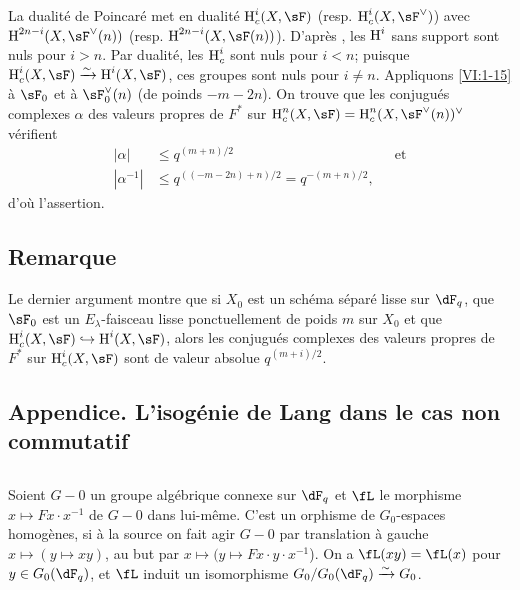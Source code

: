 La dualit\'e de Poincar\'e met en dualit\'e $\h_c^i(X,\sF)$ (resp. 
$\h_c^i(X,\sF^\vee)$) avec $\h^{2n-i}(X,\sF^\vee(n))$ (resp. 
$\h^{2n-i}(X,\sF(n))$). D'apr\`es \cite[XIV 3.2]{sga4}, les $\operatorname{H}^i$ sans support 
sont nuls pour $i>n$. Par dualit\'e, les $\operatorname{H}_c^i$ sont nuls pour $i<n$; puisque 
$\h_c^i(X,\sF) \iso \h^i(X,\sF)$, ces groupes sont nuls pour $i\ne n$. 
Appliquons \ref{VI:1-15} \`a $\sF_0$ et \`a $\sF_0^\vee(n)$ (de poinds 
$-m-2n$). On trouve que les conjugu\'es complexes $\alpha$ des valeurs propres 
de $F^\ast$ sur $\h_c^n(X,\sF) = \h_c^n(X,\sF^\vee(n))^\vee$ v\'erifient 
\begin{align*}
  |\alpha| &\leqslant q^{(m+n)/2} && \text{et} \\
  |\alpha^{-1}| &\leqslant q^{((-m-2n)+n)/2} = q^{-(m+n)/2} \text{,}
\end{align*}
d'o\`u l'assertion. 





\subsection{Remarque}\label{VI:1-21}

Le dernier argument montre que si $X_0$ est un sch\'ema s\'epar\'e lisse sur 
$\dF_q$, que $\sF_0$ est un $E_\lambda$-faisceau lisse ponctuellement de poids 
$m$ sur $X_0$ et que $\h_c^i(X,\sF) \hookrightarrow \h^i(X,\sF)$, alors les 
conjugu\'es complexes des valeurs propres de $F^\ast$ sur $\h_c^i(X,\sF)$ sont 
de valeur absolue $q^{(m+i)/2}$. 





\subsection*{Appendice. L'isog\'enie de Lang dans le cas non commutatif}




\subsection{}\label{VI:1-22}

Soient $G-0$ un groupe alg\'ebrique connexe sur $\dF_q$ et $\fL$ le morphisme 
$x\mapsto F x\cdot x^{-1}$ de $G-0$ dans lui-m\^eme. C'est un orphisme de 
$G_0$-espaces homog\`enes, si \`a la source on fait agir $G-0$ par translation 
\`a gauche $x\mapsto (y\mapsto x y)$, au but par 
$x\mapsto (y\mapsto F x\cdot y\cdot x^{-1}$). On a $\fL(xy) = \fL(x)$ pour 
$y\in G_0(\dF_q)$, et $\fL$ induit un isomorphisme $G_0/G_0(\dF_q)\iso G_0$. 

